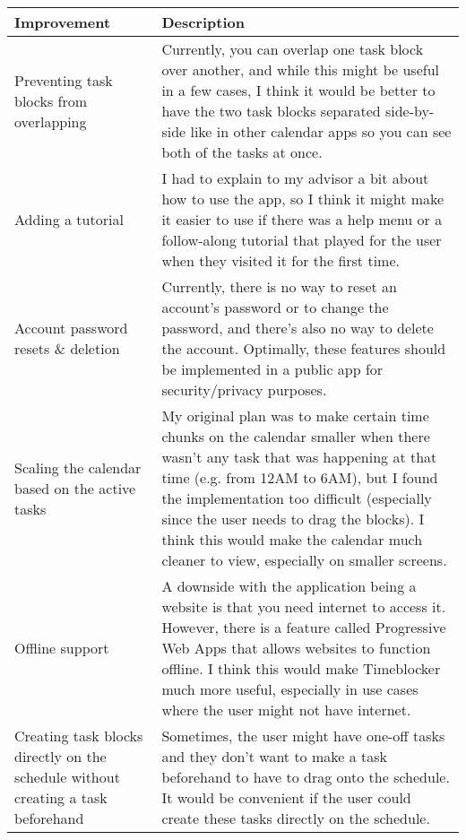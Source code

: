 \documentclass[12pt]{report}
\begin{document}
\begin{xltabular}{\linewidth}{|X|X|}
	\hline
	\textbf{Improvement}
	&
	\textbf{Description}
	\\\hline
	Preventing task blocks from overlapping
	&
	Currently, you can overlap one task block over another, and while this might be useful in a few cases, I think it would be better to have the two task blocks separated side-by-side like in other calendar apps so you can see both of the tasks at once.
	\\\hline
	Adding a tutorial
	&
	I had to explain to my advisor a bit about how to use the app, so I think it might make it easier to use if there was a help menu or a follow-along tutorial that played for the user when they visited it for the first time.
	\\\hline
	Account password resets \& deletion
	&
	Currently, there is no way to reset an account's password or to change the password, and there's also no way to delete the account. Optimally, these features should be implemented in a public app for security/privacy purposes.
	\\\hline
	Scaling the calendar based on the active tasks
	&
	My original plan was to make certain time chunks on the calendar smaller when there wasn't any task that was happening at that time (e.g. from 12AM to 6AM), but I found the implementation too difficult (especially since the user needs to drag the blocks). I think this would make the calendar much cleaner to view, especially on smaller screens.
	\\\hline
	Offline support
	&
	A downside with the application being a website is that you need internet to access it. However, there is a feature called Progressive Web Apps that allows websites to function offline. I think this would make Timeblocker much more useful, especially in use cases where the user might not have internet.
	\\\hline
	Creating task blocks directly on the schedule without creating a task beforehand
	&
	Sometimes, the user might have one-off tasks and they don't want to make a task beforehand to have to drag onto the schedule. It would be convenient if the user could create these tasks directly on the schedule.
	\\\hline
\end{xltabular}
\end{document}

